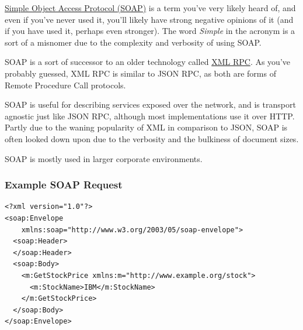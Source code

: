 \documentclass{book}
\begin{document}
\href{https://en.wikipedia.org/wiki/SOAP}{Simple Object Access Protocol (SOAP)} is a term you've very likely heard of, and even if you've never used it, you'll likely have strong negative opinions of it (and if you have used it, perhaps even stronger). The word \emph{Simple} in the acronym is a sort of a misnomer due to the complexity and verbosity of using SOAP.

SOAP is a sort of successor to an older technology called \href{https://en.wikipedia.org/wiki/XML-RPC}{XML RPC}. As you've probably guessed, XML RPC is similar to JSON RPC, as both are forms of Remote Procedure Call protocols.

SOAP is useful for describing services exposed over the network, and is transport agnostic just like JSON RPC, although most implementations use it over HTTP. Partly due to the waning popularity of XML in comparison to JSON, SOAP is often looked down upon due to the verbosity and the bulkiness of document sizes.

SOAP is mostly used in larger corporate environments.

\subsubsection{Example SOAP Request}

\begin{verbatim}
<?xml version="1.0"?>
<soap:Envelope
    xmlns:soap="http://www.w3.org/2003/05/soap-envelope">
  <soap:Header>
  </soap:Header>
  <soap:Body>
    <m:GetStockPrice xmlns:m="http://www.example.org/stock">
      <m:StockName>IBM</m:StockName>
    </m:GetStockPrice>
  </soap:Body>
</soap:Envelope>
\end{verbatim}



\end{document}
